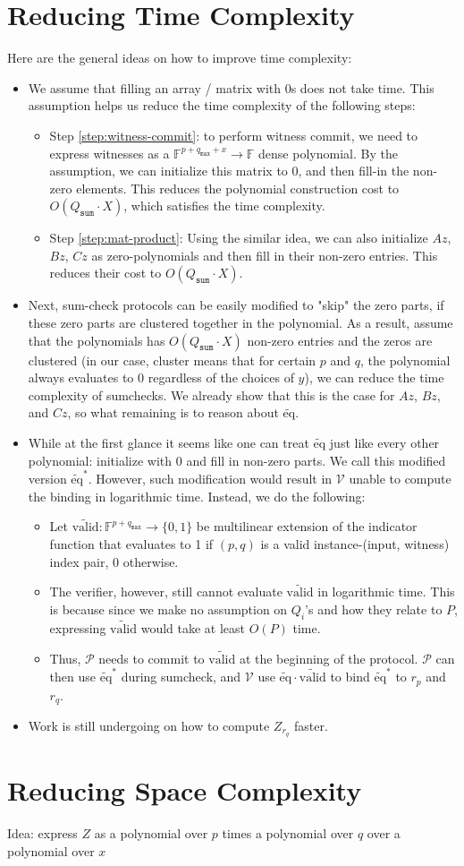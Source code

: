 \documentclass{article}
\newcommand{\Qsum}{Q_{\mathtt{sum}}}
\newcommand{\qmax}{q_{\mathtt{max}}}
\renewcommand{\P}{\mathcal{P}}
\newcommand{\V}{\mathcal{V}}
\newcommand{\F}{\mathbb{F}}
\newcommand{\eq}{\widetilde{\mbox{eq}}}
\newcommand{\valid}{\tilde{\mbox{valid}}}
\begin{document}
\section{Reducing Time Complexity}\label{reduce-time}
Here are the general ideas on how to improve time complexity:
\begin{itemize}
    \item We assume that filling an array / matrix with 0s does not take time. This assumption helps us reduce the time complexity of the following steps:
    \begin{itemize}
        \item Step \ref{step:witness-commit}: to perform witness commit, we need to express witnesses as a $\F^{p + \qmax + x}\to\F$ dense polynomial. By the assumption, we can initialize this matrix to 0, and then fill-in the non-zero elements. This reduces the polynomial construction cost to $O(\Qsum \cdot X)$, which satisfies the time complexity.
        \item Step \ref{step:mat-product}: Using the similar idea, we can also initialize $Az$, $Bz$, $Cz$ as zero-polynomials and then fill in their non-zero entries. This reduces their cost to $O(\Qsum \cdot X)$.
    \end{itemize}
    \item Next, sum-check protocols can be easily modified to "skip" the zero parts, if these zero parts are clustered together in the polynomial. As a result, assume that the polynomials has $O(\Qsum \cdot X)$ non-zero entries and the zeros are clustered (in our case, cluster means that for certain $p$ and $q$, the polynomial always evaluates to 0 regardless of the choices of $y$), we can reduce the time complexity of sumchecks. We already show that this is the case for $Az$, $Bz$, and $Cz$, so what remaining is to reason about $\eq$.
    \item While at the first glance it seems like one can treat $\eq$ just like every other polynomial: initialize with 0 and fill in non-zero parts. We call this modified version $\eq^*$. However, such modification would result in $\V$ unable to compute the binding in logarithmic time. Instead, we do the following:
    \begin{itemize}
        \item Let $\valid:\F^{p + \qmax}\to \{0, 1\}$ be multilinear extension of the indicator function that evaluates to 1 if $(p, q)$ is a valid instance-(input, witness) index pair, 0 otherwise.
        \item The verifier, however, still cannot evaluate $\valid$ in logarithmic time. This is because since we make no assumption on $Q_i$'s and how they relate to $P$, expressing $\valid$ would take at least $O(P)$ time.
        \item Thus, $\P$ needs to commit to $\valid$ at the beginning of the protocol. $\P$ can then use $\eq^*$ during sumcheck, and $\V$ use $\eq \cdot \valid$ to bind $\eq^*$ to $r_p$ and $r_q$.
    \end{itemize}
    \item Work is still undergoing on how to compute $Z_{r_q}$ faster.
\end{itemize}

\section{Reducing Space Complexity}\label{reduce-space}

Idea: express $Z$ as a polynomial over $p$ times a polynomial over $q$ over a polynomial over $x$
\end{document}
